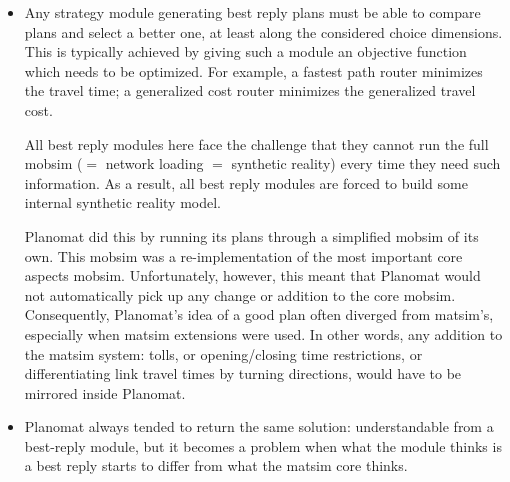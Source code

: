 \begin{itemize}\styleItemize
\item Any strategy module generating best reply plans must be able to compare plans and select a better one, at least along the considered choice dimensions. This is typically achieved by giving such a module an objective function which needs to be optimized. For example, a fastest path router minimizes the travel time; a generalized cost router minimizes the generalized travel cost.

All best reply modules here face the challenge that they cannot run the full \gls{mobsim} ($=$ network loading $=$ synthetic reality) every time they need such information. As a result, all best reply modules are forced to build some internal synthetic reality model.  

Planomat did this by running its plans through a simplified \gls{mobsim} of its own. This \gls{mobsim} was a re-implementation of the most important core aspects \gls{mobsim}.
%
%
Unfortunately, however, this meant that Planomat would not automatically pick up any change or addition to the core \gls{mobsim}.
%
Consequently,  Planomat's idea of a good plan often diverged from \gls{matsim}'s, especially when \gls{matsim} extensions were used.
%
In other words, any addition to the \gls{matsim} system: \eg tolls, or opening/closing time restrictions, or differentiating link travel times by turning directions, would have to be mirrored inside Planomat.
%
\item Planomat always tended to return the same solution: understandable from a best-reply module, but it becomes a problem when what the module thinks is a best reply starts to differ from what the \gls{matsim} core thinks.  


\end{itemize}
